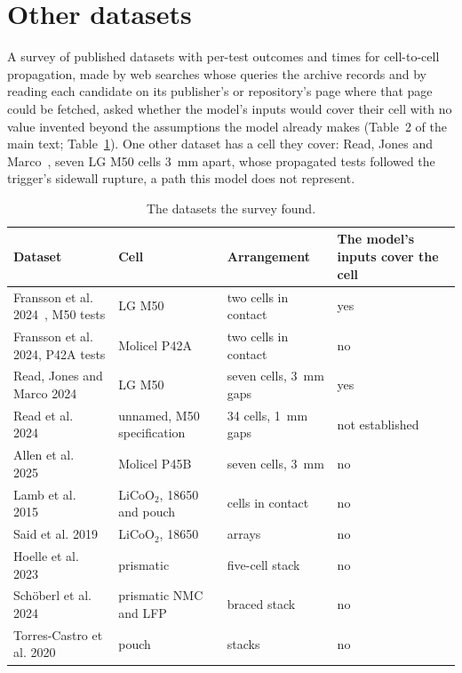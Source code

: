 \documentclass[preprint,12pt]{elsarticle}
\begin{document}
\section{Other datasets}
\label{sec:s-survey}

A survey of published datasets with per-test outcomes and times for cell-to-cell propagation, made by web searches whose queries the archive records and by reading each candidate on its publisher's or repository's page where that page could be fetched, asked whether the model's inputs would cover their cell with no value invented beyond the assumptions the model already makes (Table~2 of the main text; Table~\ref{tab:s-survey}). One other dataset has a cell they cover: Read, Jones and Marco~\cite{read2024sidewall}, seven LG M50 cells 3~mm apart, whose propagated tests followed the trigger's sidewall rupture, a path this model does not represent.

\begin{table}[!htbp]
\centering
\footnotesize
\caption{The datasets the survey found.}
\label{tab:s-survey}
\begin{tabular}{p{}p{}p{}p{}}
\toprule
Dataset & Cell & Arrangement & The model's inputs cover the cell \\
\midrule
Fransson et al. 2024~\cite{fransson2024exploring}, M50 tests & LG M50 & two cells in contact & yes \\
Fransson et al. 2024, P42A tests & Molicel P42A & two cells in contact & no \\
Read, Jones and Marco 2024~\cite{read2024sidewall} & LG M50 & seven cells, 3~mm gaps & yes \\
Read et al. 2024~\cite{read2024barrier} & unnamed, M50 specification & 34 cells, 1~mm gaps & not established \\
Allen et al. 2025~\cite{allen2025sleeves} & Molicel P45B & seven cells, 3~mm & no \\
Lamb et al. 2015~\cite{lamb2015failure} & LiCoO$_2$, 18650 and pouch & cells in contact & no \\
Said et al. 2019~\cite{said2019cascading} & LiCoO$_2$, 18650 & arrays & no \\
Hoelle et al. 2023~\cite{hoelle2023simulation} & prismatic & five-cell stack & no \\
Sch\"oberl et al. 2024~\cite{schoberl2024propagation} & prismatic NMC and LFP & braced stack & no \\
Torres-Castro et al. 2020~\cite{torrescastro2020passive} & pouch & stacks & no \\
\bottomrule
\end{tabular}
\end{table}
\end{document}

